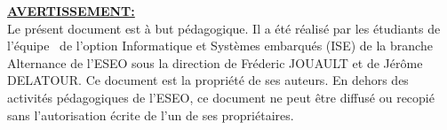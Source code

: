 \documentclass[a4paper,11pt,titlepage]{article}
\author{E3a\_2024}        %
\title{\documentName}     %
\date{\normalsize\today}    %
\begin{document}
\maketitle

\setcounter{page}{1}
\vspace*{\fill}
\noindent
\underline{\textbf{AVERTISSEMENT:}} \\
Le présent document est à but pédagogique. 
Il a été réalisé par les étudiants {\teamMembers} de l'équipe \teamNumber\ de l'option Informatique et Systèmes 
embarqués (ISE) de la branche Alternance de l’ESEO sous la direction de Fréderic JOUAULT et de Jérôme DELATOUR. 
Ce document est la propriété de ses auteurs. En dehors des activités pédagogiques de l'ESEO, 
ce document ne peut être diffusé ou recopié sans l’autorisation écrite de l'un de ses propriétaires. \\
\vspace*{\fill}
\clearpage

\tableofcontents %












\listoffigures \label{TableOfFigure} %
\end{document}
